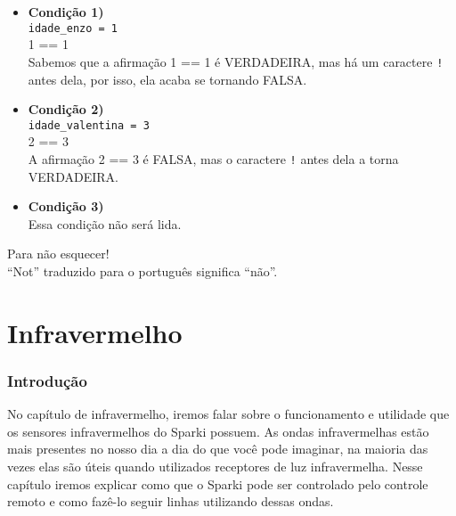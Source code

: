 \documentclass[conference]{IEEEtran}
\begin{document}
\begin{itemize} 
    \item \textbf{Condição 1)} \\ 
    \texttt{idade\_enzo = 1} \\ 
    1 == 1\\ 
    Sabemos que a afirmação 1 == 1 é VERDADEIRA, mas há um caractere \texttt{!} antes dela, por isso, ela acaba se tornando FALSA.\\
    
    \item \textbf{Condição 2)} \\ 
    \texttt{idade\_valentina = 3} \\ 
    2 == 3 \\ 
    A afirmação 2 == 3 é FALSA, mas o caractere \texttt{!} antes dela a torna VERDADEIRA.\\
    
    \item \textbf{Condição 3)} \\ 
    Essa condição não será lida.
\end{itemize}
\begin{center}
            {\color{azulbebe}Para não esquecer!}\\
            “Not” traduzido para o português significa “não”.
\end{center}

\section{\textbf{Infravermelho}}

\begin{center}
    \subsubsection{Introdução}
\end{center}
\par
No capítulo de infravermelho, iremos falar sobre o funcionamento e utilidade que os sensores infravermelhos do Sparki possuem. As ondas infravermelhas estão mais presentes no nosso dia a dia do que você pode imaginar, na maioria das vezes elas são úteis quando utilizados receptores de luz infravermelha. Nesse capítulo iremos explicar como que o Sparki pode ser controlado pelo controle remoto e como fazê-lo seguir linhas utilizando dessas ondas.
\end{document}
